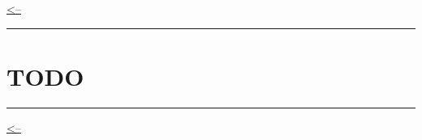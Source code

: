 \href{../README.md}{\textless--}

\begin{center}\rule{0.5\linewidth}{0.5pt}\end{center}

\section{TODO}\label{todo}

\begin{center}\rule{0.5\linewidth}{0.5pt}\end{center}

\href{../README.md}{\textless--}
